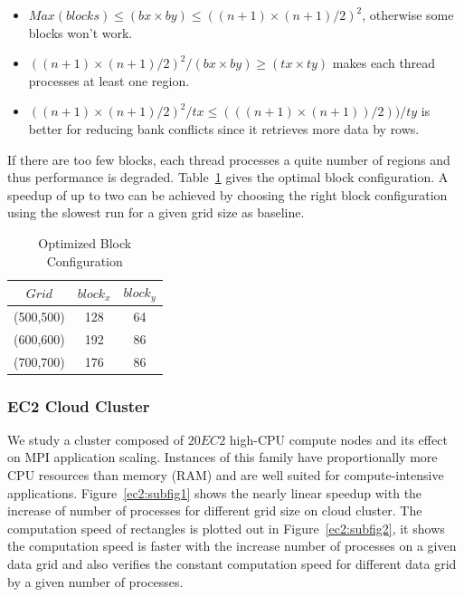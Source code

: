 \documentclass[10pt,journal,cspaper,compsoc]{IEEEtran}
\begin{document}
\begin{itemize}
\item $Max(blocks)\le (bx\times by)\le ((n+1)\times(n+1)/2)^2$, otherwise some blocks won't work.
\item $((n+1)\times(n+1)/2)^2/(bx\times by)\ge (tx\times ty)$ makes each thread processes at least one region.
\item $((n+1)\times(n+1)/2)^2/tx \le (((n+1)\times(n+1))/2))/ty$ is better for reducing bank conflicts since it retrieves more data by rows.
\end{itemize}
If there are too few blocks, each thread processes a quite number of regions and thus performance is degraded. Table~\ref{tab:op} gives the optimal block configuration. A speedup of up to two can be achieved by choosing the right block configuration using the slowest run for a given grid size as baseline.

\begin{table}[t]\small
\centering \caption{Optimized Block Configuration\label{tab:op}} \small
 \begin{tabular}{|c|c|c|}
	\hline
$Grid$ &$block_x$ &$block_y$\\
	\hline
(500,500)     & 128 & 64\\
	\hline
(600,600)     & 192 & 86\\
	\hline
(700,700)     & 176& 86\\
\hline
\end{tabular}
\label{tab:op}
\end{table}

\subsubsection{EC2 Cloud Cluster}
We study a cluster composed of $20 EC2$ high-CPU compute nodes and its effect on MPI application scaling. Instances of this family have proportionally more CPU resources than memory (RAM) and are well suited for compute-intensive applications. Figure~\ref{ec2:subfig1} shows the nearly linear speedup with the increase of number of processes for different grid size on cloud cluster. The computation speed of rectangles is plotted out in Figure~\ref{ec2:subfig2}, it shows the computation speed is faster with the increase number of processes on a given data grid and also verifies the constant computation speed for different data grid by a given number of processes.
\end{document}
